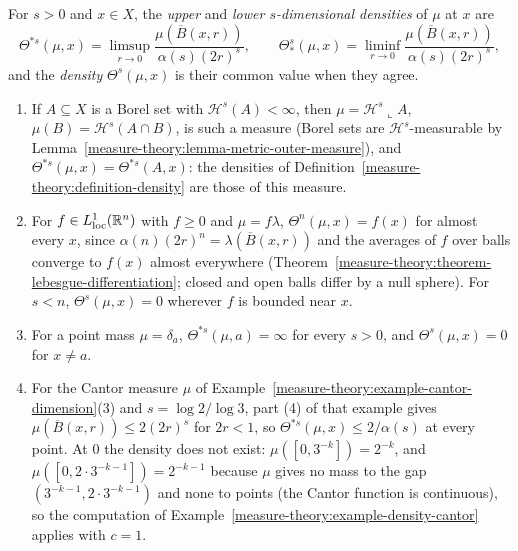 \begin{definition}\label{measure-theory:definition-measure-density}
For $s > 0$ and $x \in X$, the \emph{upper} and \emph{lower $s$-dimensional densities} of $\mu$ at $x$ are
\[
\Theta^{*s}(\mu, x) = \limsup_{r \to 0}\frac{\mu(\overline{B}(x, r))}{\alpha(s)(2r)^s}, \qquad \Theta^s_*(\mu, x) = \liminf_{r \to 0}\frac{\mu(\overline{B}(x, r))}{\alpha(s)(2r)^s},
\]
and the \emph{density} $\Theta^s(\mu, x)$ is their common value when they agree.
\end{definition}

\begin{example}\label{measure-theory:example-measure-density}
\begin{enumerate}
\item If $A \subseteq X$ is a Borel set with $\mathcal{H}^s(A) < \infty$, then $\mu = \mathcal{H}^s\llcorner A$, $\mu(B) = \mathcal{H}^s(A \cap B)$, is such a measure (Borel sets are
$\mathcal{H}^s$-measurable by Lemma~\ref{measure-theory:lemma-metric-outer-measure}), and $\Theta^{*s}(\mu, x) = \Theta^{*s}(A, x)$: the densities of Definition~\ref{measure-theory:definition-density} are those
of this measure.
\item For $f \in L^1_{\mathrm{loc}}(\mathbb{R}^n)$ with $f \geq 0$ and $\mu = f\lambda$, $\Theta^n(\mu, x) = f(x)$ for almost every $x$, since $\alpha(n)(2r)^n = \lambda(\overline{B}(x, r))$ and the averages of $f$ over balls
converge to $f(x)$ almost everywhere (Theorem~\ref{measure-theory:theorem-lebesgue-differentiation}; closed and open balls differ by a null sphere). For $s < n$, $\Theta^s(\mu, x) = 0$ wherever $f$ is
bounded near $x$.
\item For a point mass $\mu = \delta_a$, $\Theta^{*s}(\mu, a) = \infty$ for every $s > 0$, and $\Theta^s(\mu, x) = 0$ for $x \neq a$.
\item For the Cantor measure $\mu$ of Example~\ref{measure-theory:example-cantor-dimension}(3) and $s = \log 2/\log 3$, part (4) of that example gives $\mu(\overline{B}(x, r)) \leq 2(2r)^s$ for $2r < 1$, so
$\Theta^{*s}(\mu, x) \leq 2/\alpha(s)$ at every point. At $0$ the density does not exist: $\mu([0, 3^{-k}]) = 2^{-k}$, and $\mu([0, 2 \cdot 3^{-k-1}]) = 2^{-k-1}$ because $\mu$ gives no
mass to the gap $(3^{-k-1}, 2 \cdot 3^{-k-1})$ and none to points (the Cantor function is continuous), so the computation of Example~\ref{measure-theory:example-density-cantor} applies with $c = 1$.
\end{enumerate}
\end{example}

